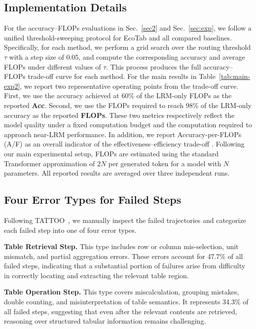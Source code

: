 \documentclass[11pt]{article}
\begin{document}
\subsection{Implementation Details}
\label{sec:a3}
\vspace{-3pt}
For the accuracy--FLOPs evaluations in Sec.~\ref{sec2} and Sec.~\ref{sec:exp}, we follow a unified threshold-sweeping protocol for EcoTab and all compared baselines. Specifically, for each method, we perform a grid search over the routing threshold $\tau$ with a step size of 0.05, and compute the corresponding accuracy and average FLOPs under different values of $\tau$. This process produces the full accuracy--FLOPs trade-off curve for each method. For the main results in Table~\ref{tab:main-exp2}, we report two representative operating points from the trade-off curve. First, we use the accuracy achieved at 60\% of the LRM-only FLOPs as the reported \textbf{Acc}. Second, we use the FLOPs required to reach 98\% of the LRM-only accuracy as the reported \textbf{FLOPs}. These two metrics respectively reflect the model quality under a fixed computation budget and the computation required to approach near-LRM performance.
In addition, we report Accuracy-per-FLOPs (A/F) as an overall indicator of the effectiveness--efficiency trade-off \citep{ma2025cot}. Following our main experimental setup, FLOPs are estimated using the standard Transformer approximation of $2N$ per generated token for a model with $N$ parameters. All reported results are averaged over three independent runs.


\subsection{Four Error Types for Failed Steps}

Following TATTOO~\citep{zou2026tattoo}, we manually inspect the failed trajectories and categorize each failed step into one of four error types.

\textbf{Table Retrieval Step.}
This type includes row or column mis-selection, unit mismatch, and partial aggregation errors. These errors account for 47.7\% of all failed steps, indicating that a substantial portion of failures arise from difficulty in correctly locating and extracting the relevant table region.

\textbf{Table Operation Step.}
This type covers miscalculation, grouping mistakes, double counting, and misinterpretation of table semantics. It represents 34.3\% of all failed steps, suggesting that even after the relevant contents are retrieved, reasoning over structured tabular information remains challenging.
\end{document}
